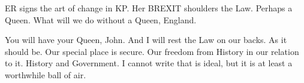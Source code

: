 

ER signs the art of change in KP.  Her BREXIT shoulders the Law.
Perhaps a Queen.  What will we do without a Queen, England.

You will have your Queen, John.  And I will rest the Law on our backs.
As it should be.  Our special place is secure.  Our freedom from
History in our relation to it.  History and Government.  I cannot
write that is ideal, but it is at least a worthwhile ball of air.


\bye
